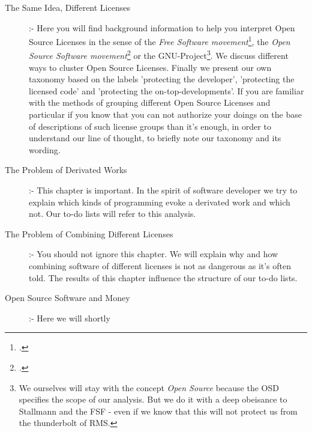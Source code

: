 \begin{description}
  \item[The Same Idea, Different Licenses] :- Here you will find background
  information to help you interpret Open Source Licenses in the sense of the
  \emph{Free Software movement}\footcite[At least at this place you are perhaps
  expecting that we use the logograms FLOSS, F/OSS, F/LOSS, or whatever. As you
  will read later on the word \textit{Free} is ambiguous and has strained the
  use of the concept \textit{Free Software}. Later on we will also talk about
  the invention of the concept \textit{Open Source} designed as a 'replacement'
  and acting as a 'splitter'. The mentioned logograms are introduced to
  re-establish or - at least - to underline the common history and the common
  center of 'both' movements, whereby the word \textit{Libre} shall resolve the
  ambiguity of the word \textit{Free}. For a first survey cf.] [\nopage
  wp.]{wpFloss2011a}, the \emph{Open Source Software movement}\footcite[For
  another brief and informative introduction cf.][231ff esp. p.
  232f.]{Fogel2006a} or the GNU-Project\footnote{ We ourselves will stay with the
  concept \textit{Open Source} because the OSD specifies the scope of our
  analysis. But we do it with a deep obeisance to Stallmann and the FSF - even
  if we know that this will not protect us from the thunderbolt of RMS.}. We discuss
  different ways to cluster Open Source Licenses. Finally we present our own
  taxonomy based on the labels 'protecting the developer', 'protecting the
  licensed code' and 'protecting the on-top-developments'. If you are familiar
  with the methods of grouping different Open Source Licenses and particular
  if you know that you can not authorize your doings on the base of descriptions
  of such license groups than it's enough, in order to understand our line of
  thought, to briefly note our taxonomy and its wording.
  \item[The Problem of Derivated Works] :- This chapter is important. In the
  spirit of software developer we try to explain which kinds of programming
  evoke a derivated work and which not. Our to-do lists will refer to this
  analysis.
  \item[The Problem of Combining Different Licenses] :- You should
  not ignore this chapter. We will explain why and how combining software
  of different licenses is not as dangerous as it's often told. The results of
  this chapter influence the structure of our to-do lists.
  \item[Open Source Software and Money] :- Here we will shortly

\end{description}
